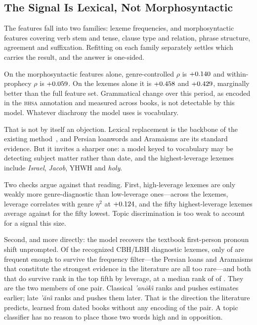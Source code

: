 \documentclass[10pt,letterpaper]{article}
\newcommand{\bhsa}{\textsc{bhsa}}
\begin{document}
\subsection*{The Signal Is Lexical, Not Morphosyntactic}

The features fall into two families: \LXnlex{} lexeme frequencies, and
\RTBfeat{} morphosyntactic features covering verb stem and tense, clause type
and relation, phrase structure, agreement and suffixation.  Refitting on each
family separately settles which carries the result, and the answer is
one-sided.

On the morphosyntactic features alone, genre-controlled $\rho$ is
$+0.140$ and within-prophecy $\rho$ is $+0.059$.  On the lexemes alone it
is $+0.458$ and $+0.429$, marginally better than the full feature set.
Grammatical change over this period, as encoded in the \bhsa{} annotation and
measured across \HBbooks{} books, is not detectable by this model.  Whatever
diachrony the model uses is vocabulary.

That is not by itself an objection.  Lexical replacement is the backbone of the
existing method~\cite{Hurvitz1982}, and Persian loanwords and Aramaisms are its
standard evidence.  But it invites a sharper one: a model keyed to vocabulary
may be detecting subject matter rather than date, and the highest-leverage
lexemes include \emph{Israel}, \emph{Jacob}, YHWH and \emph{holy}.

Two checks argue against that reading.  First, high-leverage lexemes are only
weakly more genre-diagnostic than low-leverage ones---across the \LXnlex{}
lexemes, leverage correlates with genre $\eta^2$ at $+0.124$, and the fifty
highest-leverage lexemes average \LXetaTop{} against \LXetaBot{} for the fifty
lowest.  Topic discrimination is too weak to account for a signal this size.

Second, and more directly: the model recovers the textbook first-person pronoun
shift unprompted.  Of the recognized CBH/LBH diagnostic lexemes, only
\LXdiagPresent{} of \LXdiagTotal{} are frequent enough to survive the frequency
filter---the Persian loans and Aramaisms that constitute the strongest evidence
in the literature are all too rare---and both that do survive rank in the top
fifth by leverage, at a median rank of \LXdiagRank{} of \LXnlex.  They are the
two members of one pair.  Classical \emph{'an\=ok\^\i}{} ranks
\LXanokiRank{} and pushes estimates earlier; late \emph{'\u{a}n\^\i}{}
ranks \LXaniRank{} and pushes them later.  That is the direction the literature
predicts, learned from dated books without any encoding of the pair.  A topic
classifier has no reason to place those two words high and in opposition.
\end{document}
